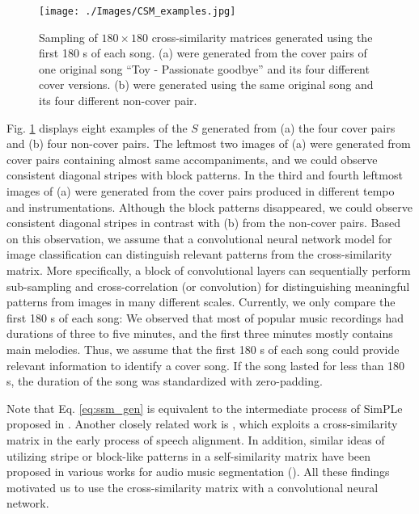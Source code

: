 \documentclass{article}
\begin{document}
\begin{figure}[t] 
\begin{center}
\texttt{[image: ./Images/CSM\_examples.jpg]}
\end{center}
\caption{Sampling of $180 \times 180$ cross-similarity matrices generated using the first 180 s of each song. (a) were generated from the cover pairs of one original song ``Toy - Passionate goodbye'' and its four different cover versions. (b) were generated using the same original song and its four different non-cover pair.} 
\label{fig:xsimmtx_ex}
\end{figure}

Fig. \ref{fig:xsimmtx_ex} displays eight examples of the $S$ generated from (a) the four cover pairs and (b) four non-cover pairs. The leftmost two images of (a) were generated from cover pairs containing almost same accompaniments, and we could observe consistent diagonal stripes with block patterns. In the third and fourth leftmost images of (a) were generated from the cover pairs produced in different tempo and instrumentations. Although the block patterns disappeared, we could observe consistent diagonal stripes in contrast with (b) from the non-cover pairs. Based on this observation, we assume that a convolutional neural network model for image classification can distinguish relevant patterns from the cross-similarity matrix. More specifically, a block of convolutional layers can sequentially perform sub-sampling and cross-correlation (or convolution) for distinguishing meaningful patterns from images in many different scales. Currently, we only compare the first 180 s of each song: We observed that most of popular music recordings had durations of three to five minutes, and  the first three minutes mostly contains main melodies. Thus, we assume that the first 180 s of each song could provide relevant information to identify a cover song. If the song lasted for less than 180 s, the duration of the song was standardized with zero-padding.

Note that Eq. \ref{eq:ssm_gen} is equivalent to the intermediate process of SimPLe proposed in \cite{silva2016simple}. Another closely related work is \citet{sakoe1978dynamic}, which exploits a cross-similarity matrix in the early process of speech alignment. In addition, similar ideas of utilizing stripe or block-like patterns in a self-similarity matrix have been proposed  in various works for audio music segmentation (\citet{paulus2010state}). All these findings motivated us to use the cross-similarity matrix with a convolutional neural network.
\end{document}
